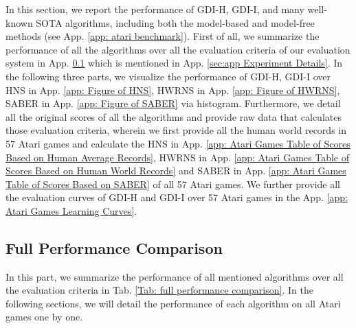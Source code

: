 \documentclass[nohyperref]{article}
\theoremstyle{plain}
\begin{document}
In this section, we report the performance of GDI-H, GDI-I, and many well-known SOTA algorithms, including both the model-based and model-free methods (see App. \ref{app: atari benchmark}). First of all, we summarize the performance of all the algorithms over all the evaluation criteria of our evaluation system in App. \ref{app: Full Performance Comparison} which is mentioned in App. \ref{sec:app Experiment Details}. In the following three parts, we visualize the performance of GDI-H, GDI-I over HNS in App. \ref{app: Figure of HNS}, HWRNS in App. \ref{app: Figure of HWRNS}, SABER in App. \ref{app: Figure of SABER} via histogram. Furthermore, we detail all the original scores of all the algorithms and provide raw data that calculates those  evaluation criteria, wherein we first provide all the human world records in 57 Atari games and calculate the HNS in App. \ref{app: Atari Games Table of Scores Based on Human Average Records}, HWRNS in App. \ref{app: Atari Games Table of Scores Based on Human World Records} and SABER in App. \ref{app: Atari Games Table of Scores Based on SABER} of all 57 Atari games. We further provide all the evaluation curves of GDI-H and GDI-I over 57 Atari games in the App. \ref{app: Atari Games Learning Curves}.

\subsection{Full Performance Comparison}
\label{app: Full Performance Comparison}
In this part, we summarize the performance of all mentioned algorithms over all the evaluation criteria in Tab. \ref{Tab: full performance comparison}. In the following sections, we will detail the performance of each algorithm on all Atari games one by one. 
\end{document}
